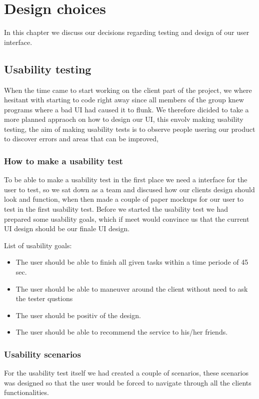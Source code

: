 \chapter{Design choices}
\label{Design choices}
In this chapter we discuss our decisions regarding testing and design of our user interface.

\section{Usability testing}
\label{Design choices_Usability testing}
When the time came to start working on the client part of the project, we where hesitant with starting to code right away since all members of the group knew programs where a bad UI had caused it to flunk. We therefore dicided to take a more planned appraoch on how to design our UI, this envolv making usability testing, the aim of making usability tests is to observe people usering our product to discover errors and areas that can be improved,

\subsection{How to make a usability test}
\label{Design choices_How to make a usability test}
To be able to make a usability test in the first place we need a interface for the user to test, so we sat down as a team and discused how our clients design should look and function, when then made a couple of paper mockups for our user to test in the first usability test.
Before we started the usability test we had prepared some usability goals, which if meet would convince us that the current UI design should be our finale UI design.

List of usability goals:
\begin{itemize}
\item The user should be able to finish all given tasks within a time periode of 45 sec.
\item The user should be able to maneuver around the client without need to ask the tester qustions
\item The user should be positiv of the design.
\item The user should be able to recommend the service to his/her friends.
\end {itemize}

\subsection{Usability scenarios}
\label{Design choices_Usability scenarios}
For the usability test itself we had created a couple of scenarios, these scenarios was designed so that the user would be forced to navigate through all the clients functionalities.

